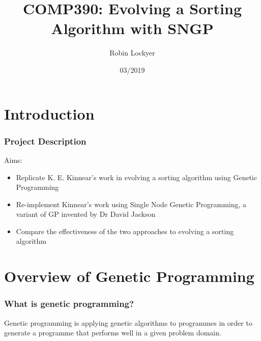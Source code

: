 \documentclass{beamer}
\title{COMP390: Evolving a Sorting Algorithm with SNGP}
\author{Robin Lockyer}
\institute{University of Liverpool}
\date{03/2019}
\begin{document}
	
	\frame{\titlepage}
	
	\frame{\tableofcontents}
	
	\section{Introduction}
	
		\begin{frame}
		
			\frametitle{Project Description}
			
			Aims:
			
			\begin{itemize}
				
				\item Replicate K. E. Kinnear's work \cite{kinnear_evolving_1993} in evolving a sorting algorithm using Genetic Programming
				
				\pause
				
				\item Re-implement Kinnear's work using Single Node Genetic Programming, a variant of GP invented by Dr David Jackson\cite{jackson_new_2012}
				
				\pause
				
				\item Compare the effectiveness of the two approaches to evolving a sorting algorithm
				 
			\end{itemize}
			
			
		\end{frame}
	
	\section{Overview of Genetic Programming}
		
		\begin{frame}
		
			\frametitle{What is genetic programming?}
			
			Genetic programming is applying genetic algorithms to programmes in order
			to generate a programme that performs well in a given problem domain.
		
		\end{frame}
	
\end{document}
